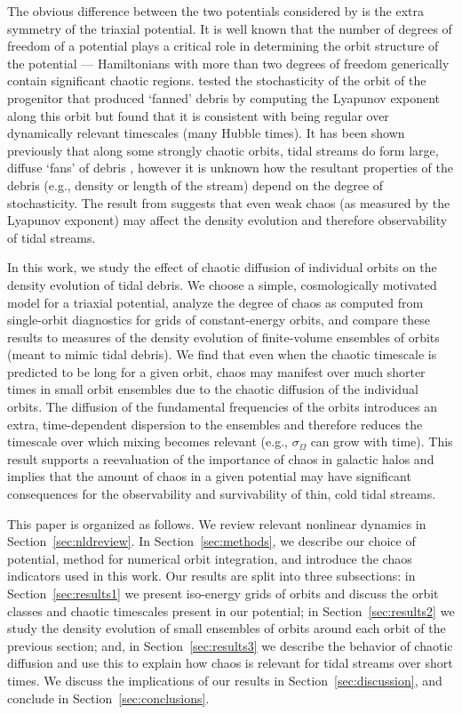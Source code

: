 \documentclass[letterpaper,12pt,preprint]{aastex}
\begin{document}
The obvious difference between the two potentials considered by \citet{pearson15} is the extra symmetry of the triaxial potential. It is well known that the number of degrees of freedom of a potential plays a critical role in determining the orbit structure of the potential --- Hamiltonians with more than two degrees of freedom generically contain significant chaotic regions. \citet{pearson15} tested the stochasticity of the orbit of the progenitor that produced `fanned' debris by computing the Lyapunov exponent along this orbit but found that it is consistent with being regular over dynamically relevant timescales (many Hubble times). It has been shown previously that along some strongly chaotic orbits, tidal streams do form large, diffuse `fans' of debris \citep[e.g.,][]{fardal14, ngan15}, however it is unknown how the resultant properties of the debris (e.g., density or length of the stream) depend on the degree of stochasticity. The result from \citet{pearson15} suggests that even weak chaos (as measured by the Lyapunov exponent) may affect the density evolution and therefore observability of tidal streams. 

In this work, we study the effect of chaotic diffusion of individual orbits on the density evolution of tidal debris. We choose a simple, cosmologically motivated model for a triaxial potential, analyze the degree of chaos as computed from single-orbit diagnostics for grids of constant-energy orbits, and compare these results to measures of the density evolution of finite-volume ensembles of orbits (meant to mimic tidal debris). We find that even when the chaotic timescale is predicted to be long for a given orbit, chaos may manifest over much shorter times in small orbit ensembles due to the chaotic diffusion of the individual orbits. The diffusion of the fundamental frequencies of the orbits introduces an extra, time-dependent dispersion to the ensembles and therefore reduces the timescale over which mixing becomes relevant (e.g., $\sigma_\Omega$ can grow with time). This result supports a reevaluation of the importance of chaos in galactic halos and implies that the amount of chaos in a given potential may have significant consequences for the observability and survivability of thin, cold tidal streams. 

This paper is organized as follows. We review relevant nonlinear dynamics in Section~\ref{sec:nldreview}. In Section~\ref{sec:methods}, we describe our choice of potential, method for numerical orbit integration, and introduce the chaos indicators used in this work. Our results are split into three subsections: in Section~\ref{sec:results1} we present iso-energy grids of orbits and discuss the orbit classes and chaotic timescales present in our potential; in Section~\ref{sec:results2} we study the density evolution of small ensembles of orbits around each orbit of the previous section; and, in Section~\ref{sec:results3} we describe the behavior of chaotic diffusion and use this to explain how chaos is relevant for tidal streams over short times. We discuss the implications of our results in Section~\ref{sec:discussion}, and conclude in Section~\ref{sec:conclusions}.
\end{document}
